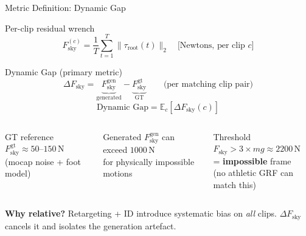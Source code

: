\documentclass[aspectratio=169, 10pt]{beamer}
\begin{document}
\begin{frame}{Metric Definition: Dynamic Gap}
  \begin{block}{Per-clip residual wrench}
    \vspace{0.3em}
    \[
      F_\text{sky}^{(c)} = \frac{1}{T}\sum_{t=1}^{T} \|\tau_\text{root}(t)\|_2
      \quad \text{[Newtons, per clip } c \text{]}
    \]
  \end{block}

  \vspace{0.4em}
  \begin{block}{Dynamic Gap (primary metric)}
    \vspace{0.3em}
    \[
      \Delta F_\text{sky} = \underbrace{F_\text{sky}^\text{gen}}_{\text{generated}} -
                            \underbrace{F_\text{sky}^\text{gt}}_{\text{GT}}
      \qquad \text{(per matching clip pair)}
    \]
    \vspace{-0.3em}
    \[
      \text{Dynamic Gap} = \mathbb{E}_c[\Delta F_\text{sky}(c)]
    \]
  \end{block}

  \vspace{0.4em}
  \begin{columns}[T]
      \begin{exampleblock}{GT reference}
        $F_\text{sky}^\text{gt} \approx 50\text{--}150\,\text{N}$\\
        (mocap noise + foot model)
      \end{exampleblock}
      \begin{alertblock}{Generated}
        $F_\text{sky}^\text{gen}$ can exceed $1000\,\text{N}$\\
        for physically impossible motions
      \end{alertblock}
      \begin{block}{Threshold}
        $F_\text{sky} > 3 \times mg \approx 2200\,\text{N}$\\
        = \textbf{impossible} frame\\
        (no athletic GRF can match this)
      \end{block}
  \end{columns}

  \vspace{0.3em}
  \small \textbf{Why relative?} Retargeting + ID introduce systematic bias on \emph{all} clips.
  $\Delta F_\text{sky}$ cancels it and isolates the generation artefact.
\end{frame}
\end{document}
